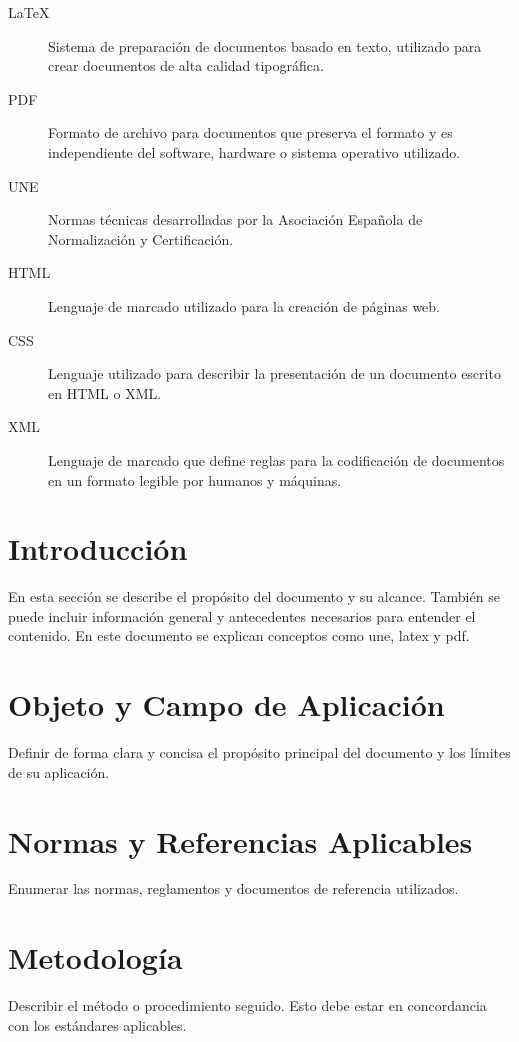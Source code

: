 \documentclass[a4paper,12pt]{article}
\begin{document}
\begin{Form}
\begin{description}
  \item[LaTeX] Sistema de preparación de documentos basado en texto, utilizado para crear documentos de alta calidad tipográfica.
  \item[PDF] Formato de archivo para documentos que preserva el formato y es independiente del software, hardware o sistema operativo utilizado.
  \item[UNE] Normas técnicas desarrolladas por la Asociación Española de Normalización y Certificación.
  \item[HTML] Lenguaje de marcado utilizado para la creación de páginas web.
  \item[CSS] Lenguaje utilizado para describir la presentación de un documento escrito en HTML o XML.
  \item[XML] Lenguaje de marcado que define reglas para la codificación de documentos en un formato legible por humanos y máquinas.
\end{description}


\newpage

\section{Introducción}
En esta sección se describe el propósito del documento y su alcance. También se puede incluir información general y antecedentes necesarios para entender el contenido.
En este documento se explican conceptos como \gls{une}, \gls{latex} y \gls{pdf}.

\section{Objeto y Campo de Aplicación}
Definir de forma clara y concisa el propósito principal del documento y los límites de su aplicación.

\section{Normas y Referencias Aplicables}
Enumerar las normas, reglamentos y documentos de referencia utilizados.


\section{Metodología}
Describir el método o procedimiento seguido. Esto debe estar en concordancia con los estándares aplicables.


\end{Form}
\end{document}
